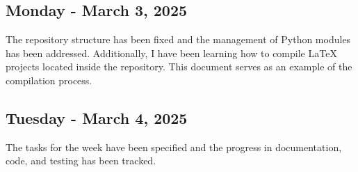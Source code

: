 \documentclass{article}
\begin{document}
\subsection{Monday - March 3, 2025}
The repository structure has been fixed and the management of Python modules has been addressed.
Additionally, I have been learning how to compile LaTeX projects located inside the repository.
This document serves as an example of the compilation process.

\subsection{Tuesday - March 4, 2025}
The tasks for the week have been specified and the progress in documentation, code, and testing has been tracked.
\end{document}

